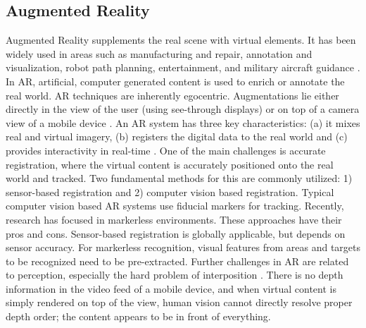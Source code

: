 \subsection{Augmented Reality}
Augmented Reality supplements the real scene with virtual elements. It has been widely used in areas such as manufacturing and repair, annotation and visualization, robot path planning, entertainment, and military aircraft guidance \cite{Krevelen2010}.
In AR, artificial, computer generated content is used to enrich or annotate the real world. AR techniques are inherently egocentric. Augmentations lie either directly in the view of the user (using see-through displays) or on top of a camera view of a mobile device \cite{Karimi2004}. 
An AR system has three key characteristics: (a) it mixes real and virtual imagery, (b) registers the digital data to the real world and (c) provides interactivity in real-time \cite{Azuma1997a}. 
One of the main challenges is accurate registration, where the virtual content is accurately positioned onto the real world and tracked. Two fundamental methods for this are commonly utilized: 1) sensor-based registration and 2) computer vision based registration. 
Typical computer vision based AR systems use fiducial markers for tracking. Recently, research has focused in markerless environments. These approaches have their pros and cons. Sensor-based registration is globally applicable, but depends on sensor accuracy. For markerless recognition, visual features from areas and targets to be recognized need to be pre-extracted. Further challenges in AR are related to perception, especially the hard problem of interposition \cite{Kruijff2010a}. There is no depth information in the video feed of a mobile device, and when virtual content is simply rendered on top of the view, human vision cannot directly resolve proper depth order; the content appears to be in front of everything.

